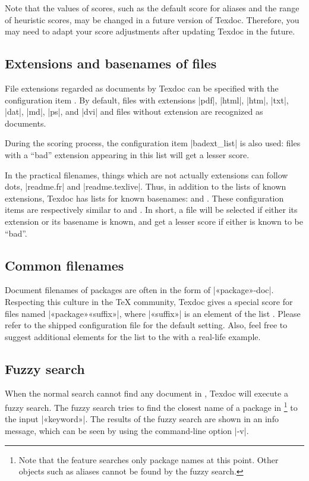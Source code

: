\documentclass{texdoc-doc}
\begin{document}
Note that the values of scores, such as the default score for aliases and the
range of heuristic scores, may be changed in a future version of Texdoc.
Therefore, you may need to adapt your score adjustments after updating Texdoc
in the future.

\subsection{Extensions and basenames of files}
\label{sec:ext}

File extensions regarded as documents by Texdoc can be specified with the
configuration item . By default, files with extensions |pdf|,
|html|, |htm|, |txt|, |dat|, |md|, |ps|, and |dvi| and files without extension
are recognized as documents.

During the scoring process, the configuration item |badext_list| is also used:
files with a ``bad'' extension appearing in this list will get a lesser score.

In the practical filenames, things which are not actually extensions can follow
dots, \eg |readme.fr| and |readme.texlive|. Thus, in addition to the lists of
known extensions, Texdoc has lists for known basenames:  and
. These configuration items are respectively similar to
 and . In short, a file will be selected if
either its extension or its basename is known, and get a lesser score if either
is known to be ``bad''.

\subsection{Common filenames}
\label{sec:common-names}

Document filenames of packages are often in the form of |«package»-doc|.
Respecting this culture in the {\TeX} community, Texdoc gives a special score
for files named |«package»«suffix»|, where |«suffix»| is an element of the list
. Please refer to the shipped configuration file for the
default setting. Also, feel free to suggest additional elements for the list to
the {\TexdocML} with a real-life example.

\subsection{Fuzzy search}
\label{sec:fuzzy}

When the normal search cannot find any document in {\TL}, Texdoc will execute a
fuzzy search. The fuzzy search tries to find the closest name of a package in
{\TL}\footnote{Note that the feature searches only package names at this point.
Other objects such as aliases cannot be found by the fuzzy search.} to the
input |«keyword»|. The results of the fuzzy search are shown in an info
message, which can be seen by using the command-line option |-v|.
\end{document}
